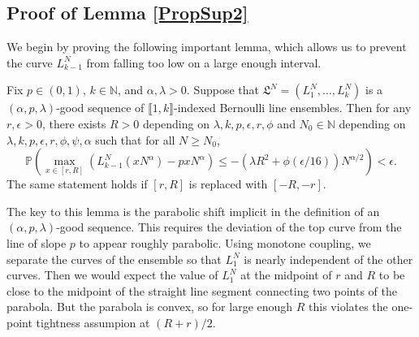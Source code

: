 \subsection{Proof of Lemma \ref{PropSup2}}\label{Section5.2}

	We begin by proving the following important lemma, which allows us to prevent the curve $L_{k-1}^N$ from falling too low on a large enough interval.
	
	\begin{lemma}\label{21}
		Fix $p\in (0,1)$, $k\in\mathbb{N}$, and $\alpha,\lambda > 0$. Suppose that $\mathfrak{L}^N = (L_1^N, \dots, L_k^N)$ is a $(\alpha,p,\lambda)$-good sequence of $\llbracket 1, k\rrbracket$-indexed Bernoulli line ensembles. Then for any $r,\epsilon>0$, there exists $R>0$ depending on $\lambda,k,p,\epsilon,r,\phi$ and $N_0 \in \mathbb{N}$ depending on $\lambda,k,p,\epsilon,r,\phi,\psi,\alpha$ such that for all $N\geq N_0$,
		\[
		\mathbb{P}\left(\max_{x\in[r,R]} \left(L_{k-1}^N(xN^\alpha) - pxN^\alpha\right) \leq -(\lambda R^2 + \phi(\epsilon/16))N^{\alpha/2}\right) < \epsilon.
		\]
		The same statement holds if $[r,R]$ is replaced with $[-R,-r]$.
	\end{lemma}

	\begin{remark}
		The key to this lemma is the parabolic shift implicit in the definition of an $(\alpha,p,\lambda)$-good sequence. This requires the deviation of the top curve from the line of slope $p$ to appear roughly parabolic. Using monotone coupling, we separate the curves of the ensemble so that $L_1^N$ is nearly independent of the other curves. Then we would expect the value of $L_1^N$ at the midpoint of $r$ and $R$ to be close to the midpoint of the straight line segment connecting two points of the parabola. But the parabola is convex, so for large enough $R$ this violates the one-point tightness assumpion at $(R+r)/2$.
	\end{remark}
	
